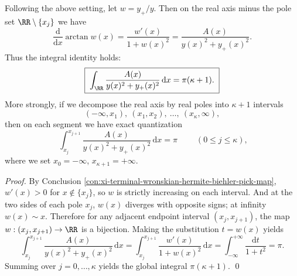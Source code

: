 \begin{conclusion}[Phase Quantization: \texorpdfstring{$\int_{\RR}\frac{A}{y^2+y_{+}^2}=\pi(\kappa+1)$}{int A/(y^2+y+^2)=pi(k+1)} and \texorpdfstring{$\pi$}{pi}-Step Segmentation]\label{con:xi-terminal-wronskian-phase-quantization}
Following the above setting, let \(w=y_{+}/y\).
Then on the real axis minus the pole set \(\RR\setminus\{x_j\}\) we have
\[
\frac{\mathrm{d}}{\mathrm{d}x}\arctan w(x)
=\frac{w'(x)}{1+w(x)^2}
=\frac{A(x)}{y(x)^2+y_{+}(x)^2}.
\]
Thus the integral identity holds:
\[
\boxed{\;\int_{\RR}\frac{A(x)}{y(x)^2+y_{+}(x)^2}\,\mathrm{d}x=\pi(\kappa+1).\;}
\]
More strongly, if we decompose the real axis by real poles into \(\kappa+1\) intervals
\[
(-\infty,x_1),\ (x_1,x_2),\ \dots,\ (x_\kappa,\infty),
\]
then on each segment we have exact quantization
\[
\boxed{\;\int_{x_j}^{x_{j+1}}\frac{A(x)}{y(x)^2+y_{+}(x)^2}\,\mathrm{d}x=\pi\;}
\qquad(0\le j\le \kappa),
\]
where we set \(x_0=-\infty\), \(x_{\kappa+1}=+\infty\).
\end{conclusion}
\begin{proof}
By Conclusion \ref{con:xi-terminal-wronskian-hermite-biehler-pick-map}, \(w'(x)>0\) for \(x\notin\{x_j\}\), so \(w\) is strictly increasing on each interval.
And at the two sides of each pole \(x_j\), \(w(x)\) diverges with opposite signs; at infinity \(w(x)\sim x\).
Therefore for any adjacent endpoint interval \((x_j,x_{j+1})\), the map \(w:(x_j,x_{j+1})\to\RR\) is a bijection.
Making the substitution \(t=w(x)\) yields
\[
\int_{x_j}^{x_{j+1}}\frac{A(x)}{y(x)^2+y_{+}(x)^2}\,\mathrm{d}x
=\int_{x_j}^{x_{j+1}}\frac{w'(x)}{1+w(x)^2}\,\mathrm{d}x
=\int_{-\infty}^{+\infty}\frac{\mathrm{d}t}{1+t^2}
=\pi.
\]
Summing over \(j=0,\dots,\kappa\) yields the global integral \(\pi(\kappa+1)\). \qed
\end{proof}


